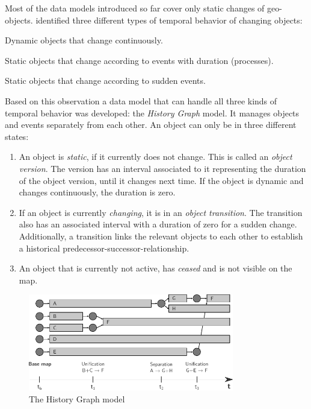Most of the data models introduced so far cover only static changes of geo-objects. \cite{renolen96} identified three different types of temporal behavior of changing objects:
\begin{compactitem}
  \item Dynamic objects that change continuously.
  \item Static objects that change according to events with duration (processes).
  \item Static objects that change according to sudden events.
\end{compactitem}

Based on this observation a data model that can handle all three kinds of temporal behavior was developed: the \emph{History Graph} model. It manages objects and events separately from each other. An object can only be in three different states:
\begin{enumerate}
  \item An object is \emph{static}, if it currently does not change. This is called an \emph{object version}. The version has an interval associated to it representing the duration of the object version, until it changes next time. If the object is dynamic and changes continuously, the duration is zero.
  \item If an object is currently \emph{changing}, it is in an \emph{object transition}. The transition also has an associated interval with a duration of zero for a sudden change. Additionally, a transition links the relevant objects to each other to establish a historical predecessor-successor-relationship.
  \item An object that is currently not active, has \emph{ceased} and is not visible on the map.
\end{enumerate}

\begin{figure}[H]
  \centering
  \includegraphics[width=0.8\textwidth]{graphics/basics/stdm/history_graph_model}
  \caption{The History Graph model}
  \label{fig:history_graph_model}
\end{figure}

